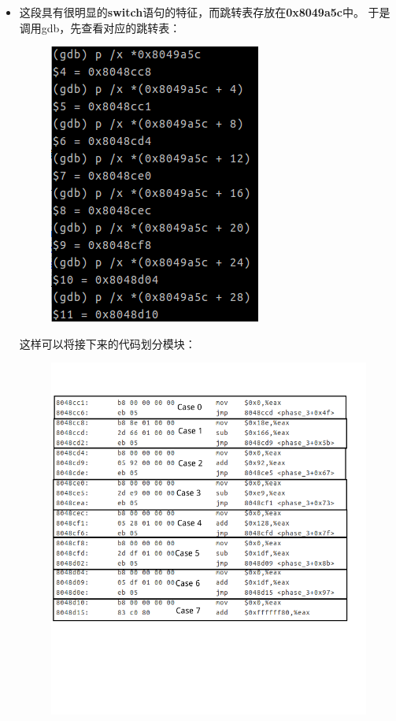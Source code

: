\begin{itemize}
	\item
	这段具有很明显的\textbf{switch}语句的特征，而跳转表存放在\textbf{0x8049a5c}中。
\newpage		
	于是调用gdb，先查看对应的跳转表：	
	\begin{figure}[h]
		\centering
			\includegraphics[scale=0.77]{images/phase_3_part_3.png}
	\end{figure}
	
	这样可以将接下来的代码划分模块：	
	
	\begin{figure}[h]
		\centering
			\includegraphics[scale=0.77]{images/phase_3_part_4.png}
	\end{figure}
	

\end{itemize}
